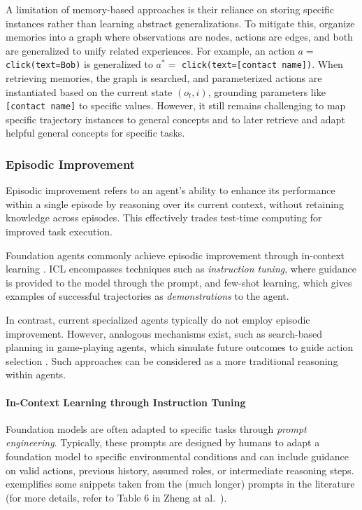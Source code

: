 A limitation of memory-based approaches is their reliance on storing specific instances rather than learning abstract generalizations. To mitigate this, \citet{lee_explore_2023} organize memories into a graph where observations are nodes, actions are edges, and both are generalized to unify related experiences. For example, an action $a=$ \texttt{click(text=Bob)} is generalized to $a^*=$ \texttt{click(text=[contact name])}. When retrieving memories, the graph is searched, and parameterized actions are instantiated based on the current state $(o_t, i)$, grounding parameters like \texttt{[contact name]} to specific values.
However, it still remains challenging to map specific trajectory instances to general concepts and to later retrieve and adapt helpful general concepts for specific tasks.


\subsubsection{Episodic Improvement}\label{sec:episodic_improvement}
Episodic improvement refers to an agent's ability to enhance its performance within a single episode by reasoning over its current context, without retaining knowledge across episodes. This effectively trades test-time computing for improved task execution.

Foundation agents commonly achieve episodic improvement through in-context learning \citep{brown_language_2020}.
ICL encompasses techniques such as \emph{instruction tuning}, where guidance is provided to the model through the prompt, and few-shot learning, which gives examples of successful trajectories as \emph{demonstrations} to the agent.

In contrast, current specialized agents typically do not employ episodic improvement. However, analogous mechanisms exist, such as search-based planning in game-playing agents, which simulate future outcomes to guide action selection \citep{silver_mastering_go_2017}. Such approaches can be considered as a more traditional reasoning within agents.

\paragraph{In-Context Learning through Instruction Tuning} \label{sec:episodic_improvement_instruction}

Foundation models are often adapted to specific tasks through \emph{prompt engineering}.
Typically, these prompts are designed by humans to adapt a foundation model to specific environmental conditions  and can include guidance on valid actions, previous history, assumed roles, or intermediate reasoning steps.
 exemplifies some snippets taken from the (much longer) prompts in the literature (for more details, refer to Table 6 in Zheng at al.~\citep{zheng_gpt-4vision_2024}). 

